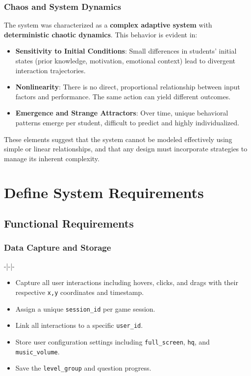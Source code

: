 \documentclass{article}
\newcommand{\reqnum}[1]{\textbf{\underline{RF-#1}}}
\begin{document}
\subsubsection*{Chaos and System Dynamics}

The system was characterized as a \textbf{complex adaptive system} with \textbf{deterministic chaotic dynamics}. This behavior is evident in:

\begin{itemize}
    \item \textbf{Sensitivity to Initial Conditions}: Small differences in students’ initial states (prior knowledge, motivation, emotional context) lead to divergent interaction trajectories.
    
    \item \textbf{Nonlinearity}: There is no direct, proportional relationship between input factors and performance. The same action can yield different outcomes.
    
    \item \textbf{Emergence and Strange Attractors}: Over time, unique behavioral patterns emerge per student, difficult to predict and highly individualized.
\end{itemize}

These elements suggest that the system cannot be modeled effectively using simple or linear relationships, and that any design must incorporate strategies to manage its inherent complexity.


\section{Define System Requirements}

\subsection{Functional Requirements}

\subsubsection{Data Capture and Storage} -|-|-
\begin{itemize}
    \item[\reqnum{001}] Capture all user interactions including hovers, clicks, and drags with their respective \texttt{x,y} coordinates and timestamp.
    \item[\reqnum{002}] Assign a unique \texttt{session\_id} per game session.
    \item[\reqnum{003}] Link all interactions to a specific \texttt{user\_id}.
    \item[\reqnum{004}] Store user configuration settings including \texttt{full\_screen}, \texttt{hq}, and \texttt{music\_volume}.
    \item[\reqnum{005}] Save the \texttt{level\_group} and question progress.
\end{itemize}
\end{document}

